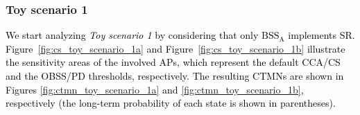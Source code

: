 \documentclass[preprint,12pt]{elsarticle}
\theoremstyle{plain}
\begin{document}
\subsubsection{Toy scenario 1}
\textcolor{black}{We start analyzing \emph{Toy scenario 1} by considering that only $\text{BSS}_\text{A}$ implements SR. Figure~\ref{fig:cs_toy_scenario_1a} and Figure~\ref{fig:cs_toy_scenario_1b} illustrate the sensitivity areas of the involved APs, which represent the default CCA/CS and the OBSS/PD thresholds, respectively. The resulting CTMNs are shown in Figures \ref{fig:ctmn_toy_scenario_1a} and \ref{fig:ctmn_toy_scenario_1b}, respectively (the long-term probability of each state is shown in parentheses).}

\begin{figure}[h!]
	\centering
	\hspace{1cm}
	\\
	\hspace{1cm}

\end{figure}
\end{document}
